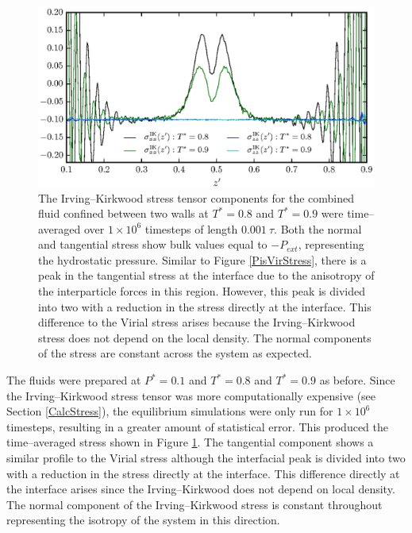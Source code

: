 \begin{figure}[h]
\centering
\includegraphics[scale=1.0]{PisIKStress}
\caption{The Irving--Kirkwood stress tensor components for the combined fluid confined between two walls at $T^{*} = 0.8$ and $T^{*} = 0.9$ were time--averaged over $1 \times 10^{6}$ timesteps of length $0.001\ \tau$.
Both the normal and tangential stress show bulk values equal to $-P_{ext}$, representing the hydrostatic pressure.
Similar to Figure \ref{PisVirStress}, there is a peak in the tangential stress at the interface due to the anisotropy of the interparticle forces in this region.
However, this peak is divided into two with a reduction in the stress directly at the interface.
This difference to the Virial stress arises because the Irving--Kirkwood stress does not depend on the local density. 
The normal components of the stress are constant across the system as expected.
}
\label{PisIKStress}
\end{figure}
\FloatBarrier 
The fluids were prepared at $P^{*}=0.1$ and $T^{*}=0.8$ and $T^{*}=0.9$ as before.
Since the Irving--Kirkwood stress tensor was more computationally expensive (see Section \ref{CalcStress}), the equilibrium simulations were only run for $1 \times 10^{6}$ timesteps, resulting in a greater amount of statistical error.
This produced the time--averaged stress shown in Figure \ref{PisIKStress}.
The tangential component shows a similar profile to the Virial stress although the interfacial peak is divided into two with a reduction in the stress directly at the interface.
This difference directly at the interface arises since the Irving--Kirkwood does not depend on local density.
The normal component of the Irving--Kirkwood stress is constant throughout representing the isotropy of the system in this direction.
\FloatBarrier

